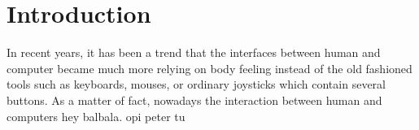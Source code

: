 \chapter{Introduction}
\label{c:intro}


In recent years, it has been a trend that the interfaces between human and computer became much more relying on body feeling instead of the old fashioned tools such as keyboards, mouses, or ordinary joysticks which contain several buttons. As a matter of fact, nowadays the interaction between human and computers
hey balbala. 
opi
peter tu
